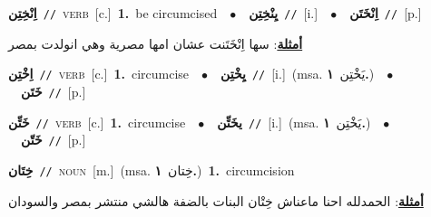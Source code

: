 \documentclass[10pt,a4paper,twoside]{article} %
\begin{document}
\begin{multicols}{2}
{{{{\setlength\topsep{0pt}\textbf{\foreignlanguage{arabic}{اِنْخِتِن}}\ {\color{gray}\texttt{//}\color{black}}\ \textsc{verb}\ [c.]\ \textbf{1.}~be circumcised\ \ $\bullet$\ \ \setlength\topsep{0pt}\textbf{\foreignlanguage{arabic}{يِنْخِتِن}}\ {\color{gray}\texttt{//}\color{black}}\ [i.]\ \ $\bullet$\ \ \setlength\topsep{0pt}\textbf{\foreignlanguage{arabic}{اِنْخَتَن}}\ {\color{gray}\texttt{//}\color{black}}\ [p.]\  \begin{flushright}\color{gray}\foreignlanguage{arabic}{\textbf{\underline{\foreignlanguage{arabic}{أمثلة}}}: سها اِنْخَتَنت عشان امها مصرية وهي انولدت بمصر}\end{flushright}\color{black}} \vspace{2mm}

{\setlength\topsep{0pt}\textbf{\foreignlanguage{arabic}{اِخْتِن}}\ {\color{gray}\texttt{//}\color{black}}\ \textsc{verb}\ [c.]\ \textbf{1.}~circumcise\ \ $\bullet$\ \ \setlength\topsep{0pt}\textbf{\foreignlanguage{arabic}{يِخْتِن}}\ {\color{gray}\texttt{//}\color{black}}\ [i.]\ \color{gray}(msa. \foreignlanguage{arabic}{يَخْتِن}~\foreignlanguage{arabic}{\textbf{١.}})\color{black}\ \ $\bullet$\ \ \setlength\topsep{0pt}\textbf{\foreignlanguage{arabic}{خَتَن}}\ {\color{gray}\texttt{//}\color{black}}\ [p.]\ 

{\setlength\topsep{0pt}\textbf{\foreignlanguage{arabic}{خَتِّن}}\ {\color{gray}\texttt{//}\color{black}}\ \textsc{verb}\ [c.]\ \textbf{1.}~circumcise\ \ $\bullet$\ \ \setlength\topsep{0pt}\textbf{\foreignlanguage{arabic}{يخَتِّن}}\ {\color{gray}\texttt{//}\color{black}}\ [i.]\ \color{gray}(msa. \foreignlanguage{arabic}{يَخْتِن}~\foreignlanguage{arabic}{\textbf{١.}})\color{black}\ \ $\bullet$\ \ \setlength\topsep{0pt}\textbf{\foreignlanguage{arabic}{خَتّن}}\ {\color{gray}\texttt{//}\color{black}}\ [p.]\ 

{\setlength\topsep{0pt}\textbf{\foreignlanguage{arabic}{خِتَان}}\ {\color{gray}\texttt{//}\color{black}}\ \textsc{noun}\ [m.]\ \color{gray}(msa. \foreignlanguage{arabic}{خِتان}~\foreignlanguage{arabic}{\textbf{١.}})\color{black}\ \textbf{1.}~circumcision\  \begin{flushright}\color{gray}\foreignlanguage{arabic}{\textbf{\underline{\foreignlanguage{arabic}{أمثلة}}}: الحمدلله احنا ماعناش خِتْان البنات بالضفة هالشي منتشر بمصر والسودان}\end{flushright}\color{black}} \vspace{2mm}

}}}}}
\end{multicols}
\end{document}

